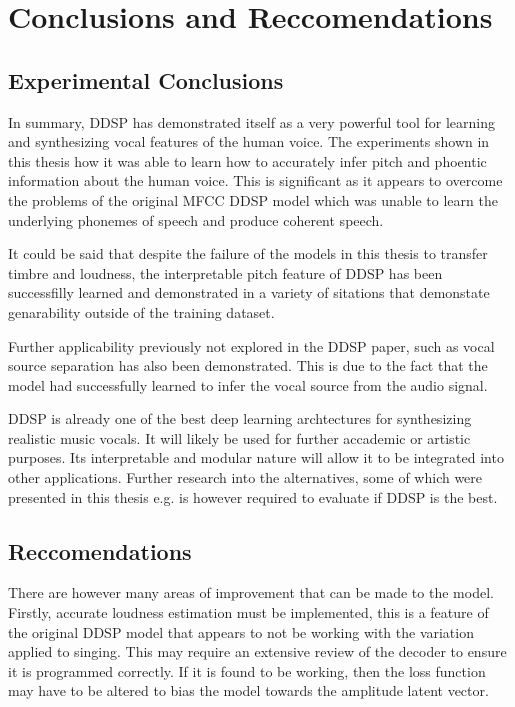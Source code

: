 \chapter{Conclusions and Reccomendations}

\section{Experimental Conclusions}

In summary, DDSP has demonstrated itself as a very powerful tool for learning and synthesizing vocal features of the human voice. The experiments shown in this thesis how it was able to learn how to accurately infer pitch and phoentic information about the human voice. This is significant as it appears to overcome the problems of the original MFCC DDSP model\cite{SingingDDSP} which was unable to learn the underlying phonemes of speech and produce coherent speech.

It could be said that despite the failure of the models in this thesis to transfer timbre and loudness, the interpretable pitch feature of DDSP has been successfilly learned and demonstrated in a variety of sitations that demonstate genarability outside of the training dataset.

Further applicability previously not explored in the DDSP paper, such as vocal source separation has also been demonstrated. This is due to the fact that the model had successfully learned to infer the vocal source from the audio signal.

DDSP is already one of the best deep learning archtectures for synthesizing realistic music vocals. It will likely be used for further accademic or artistic purposes. Its interpretable and modular nature will allow it to be integrated into other applications. Further research into the alternatives, some of which were presented in this thesis e.g.  is however required to evaluate if DDSP is the best.

\section{Reccomendations}

There are however many areas of improvement that can be made to the model. Firstly, accurate loudness estimation must be implemented, this is a feature of the original DDSP model\cite{OriginalDDSP} that appears to not be working with the variation applied to singing. This may require an extensive review of the decoder to ensure it is programmed correctly. If it is found to be working, then the loss function may have to be altered to bias the model towards the amplitude latent vector.

